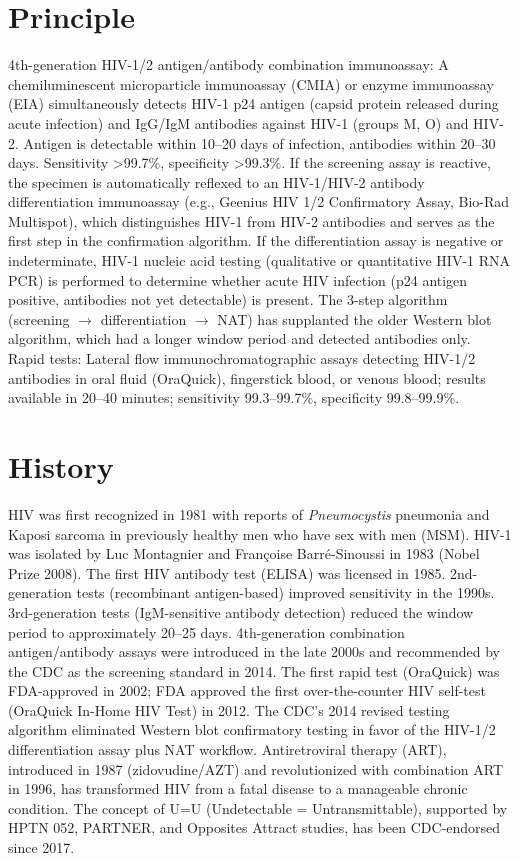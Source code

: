 \section*{Principle}
4th-generation HIV-1/2 antigen/antibody combination immunoassay: A chemiluminescent microparticle immunoassay (CMIA) or enzyme immunoassay (EIA) simultaneously detects HIV-1 p24 antigen (capsid protein released during acute infection) and IgG/IgM antibodies against HIV-1 (groups M, O) and HIV-2. Antigen is detectable within 10--20 days of infection, antibodies within 20--30 days. Sensitivity >99.7\%, specificity >99.3\%. If the screening assay is reactive, the specimen is automatically reflexed to an HIV-1/HIV-2 antibody differentiation immunoassay (e.g., Geenius HIV 1/2 Confirmatory Assay, Bio-Rad Multispot), which distinguishes HIV-1 from HIV-2 antibodies and serves as the first step in the confirmation algorithm. If the differentiation assay is negative or indeterminate, HIV-1 nucleic acid testing (qualitative or quantitative HIV-1 RNA PCR) is performed to determine whether acute HIV infection (p24 antigen positive, antibodies not yet detectable) is present. The 3-step algorithm (screening $\rightarrow$ differentiation $\rightarrow$ NAT) has supplanted the older Western blot algorithm, which had a longer window period and detected antibodies only. Rapid tests: Lateral flow immunochromatographic assays detecting HIV-1/2 antibodies in oral fluid (OraQuick), fingerstick blood, or venous blood; results available in 20--40 minutes; sensitivity 99.3--99.7\%, specificity 99.8--99.9\%.

\section*{History}
HIV was first recognized in 1981 with reports of \textit{Pneumocystis} pneumonia and Kaposi sarcoma in previously healthy men who have sex with men (MSM). HIV-1 was isolated by Luc Montagnier and Françoise Barré-Sinoussi in 1983 (Nobel Prize 2008). The first HIV antibody test (ELISA) was licensed in 1985. 2nd-generation tests (recombinant antigen-based) improved sensitivity in the 1990s. 3rd-generation tests (IgM-sensitive antibody detection) reduced the window period to approximately 20--25 days. 4th-generation combination antigen/antibody assays were introduced in the late 2000s and recommended by the CDC as the screening standard in 2014. The first rapid test (OraQuick) was FDA-approved in 2002; FDA approved the first over-the-counter HIV self-test (OraQuick In-Home HIV Test) in 2012. The CDC's 2014 revised testing algorithm eliminated Western blot confirmatory testing in favor of the HIV-1/2 differentiation assay plus NAT workflow. Antiretroviral therapy (ART), introduced in 1987 (zidovudine/AZT) and revolutionized with combination ART in 1996, has transformed HIV from a fatal disease to a manageable chronic condition. The concept of U=U (Undetectable = Untransmittable), supported by HPTN 052, PARTNER, and Opposites Attract studies, has been CDC-endorsed since 2017.

